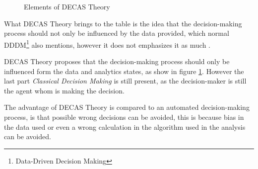 \begin{figure}[h]
    \centering
    \caption{Elements of DECAS Theory}
    \label{fig:DECASElements}
\end{figure}

What DECAS Theory brings to the table is the idea that the decision-making process 
should not only be influenced by the data provided, which normal 
DDDM\footnote{Data-Driven Decision Making} also mentions, however it does not 
emphasizes it as much \cite{Divan2017Data-drivenMaking}. 

DECAS Theory proposes that the decision-making process should only be influenced 
form the data and analytics states, as show in figure \ref{fig:DECASElements}. 
However the last part \textit{Classical Decision Making} is still present, 
as the decision-maker is still the agent whom is making the decision.

The advantage of DECAS Theory is compared to an automated decision-making process,
is that possible wrong decisions can be avoided, this is because bias in the data used
or even a wrong calculation in the algorithm used in the analysis can be avoided. 

